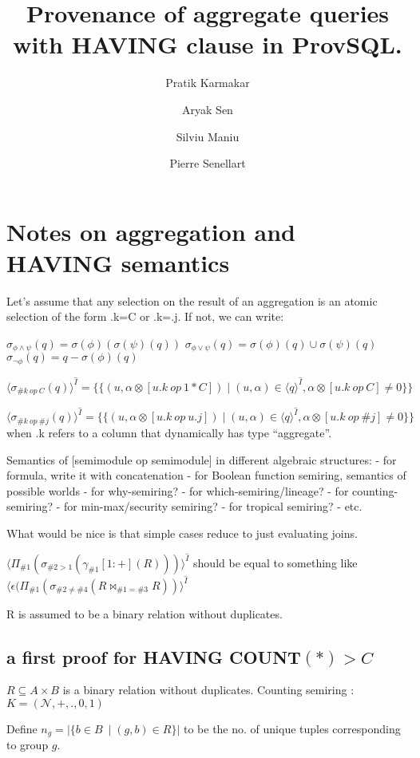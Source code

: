 \documentclass{article}
\title{Provenance of aggregate queries with HAVING clause in ProvSQL.}
\author{Pratik Karmakar \and Aryak Sen \and Silviu Maniu \and Pierre Senellart}
\date{}
\begin{document}
\maketitle
\section{Notes on aggregation and HAVING semantics}

Let's assume that any selection on the result of an aggregation is an 
atomic selection of the form .k=C or .k=.j. If not, we can write:

$\sigma_{\phi\land\psi}(q)=\sigma(\phi)(\sigma(\psi)(q))$
$\sigma_{\phi\lor\psi}(q)=\sigma(\phi)(q)\cup\sigma(\psi)(q)$
$\sigma_{\lnot\phi}(q)=q-\sigma(\phi)(q)$


$$
\langle\sigma_{\#k\ op\ C}(q)\rangle^{\hat I}
=\{\{(u,\alpha\otimes[u.k\ op\ 1*C])\mid(u,\alpha)\in \langle q\rangle^{\hat I}, \alpha\otimes[u.k\ op\ C]\neq 0\}\}
$$

$$
\langle\sigma_{\#k\ op\ \#j}(q)\rangle^{\hat I}
=\{\{(u,\alpha\otimes[u.k\ op\ u.j])\mid(u,\alpha)\in \langle q\rangle^{\hat I}, \alpha\otimes[u.k\ op\ \#j]\neq 0\}\}
$$
when .k refers to a column that dynamically has type “aggregate”.

Semantics of [semimodule op semimodule] in different algebraic structures:
- for formula, write it with concatenation
- for Boolean function semiring, semantics of possible worlds
- for why-semiring?
- for which-semiring/lineage?
- for counting-semiring?
- for min-max/security semiring?
- for tropical semiring?
- etc.

What would be nice is that simple cases reduce to just evaluating joins.

$\langle\Pi_{\#1}(\sigma_{\#2>1}(\gamma_{\#1}[1:+](R)))\rangle^{\hat I}$
should be equal to something like
$\langle \epsilon(\Pi_{\#1}(\sigma_{\#2\neq\#4}(R\bowtie_{\#1=\#3} R))\rangle^{\hat I}$

R is assumed to be a binary relation without duplicates.


\subsection{a first proof for HAVING COUNT$(*) > C$}

$R \subseteq  A \times B$ is a binary relation without duplicates.
Counting semiring : $K = (\mathcal{N}, +, ., 0, 1)$

Define $n_g = |\{b \in B\ \mid (g,b) \in R\}|$ to be the no. of unique tuples corresponding to group $g$.
\end{document}
